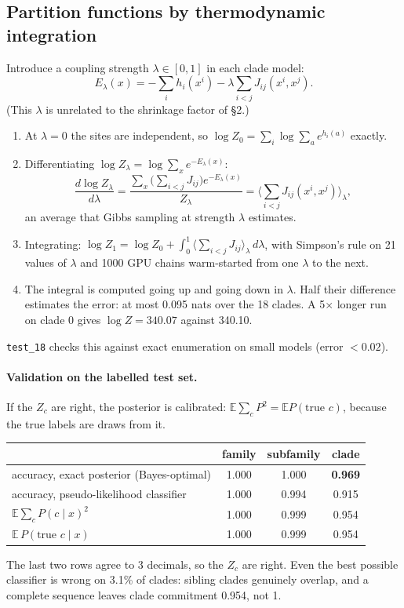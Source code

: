 \documentclass[11pt,a4paper]{article}
\newcommand{\E}{\mathbb{E}}
\begin{document}
\subsection{Partition functions by thermodynamic integration}
Introduce a coupling strength $\lambda\in[0,1]$ in each clade model:
\[
E_\lambda(x)=-\sum_ih_i(x^i)-\lambda\sum_{i<j}J_{ij}(x^i,x^j).
\]
(This $\lambda$ is unrelated to the shrinkage factor of \S2.)
\begin{enumerate}[nosep]
\item At $\lambda=0$ the sites are independent, so $\log Z_0=\sum_i\log\sum_ae^{h_i(a)}$ exactly.
\item Differentiating $\log Z_\lambda=\log\sum_xe^{-E_\lambda(x)}$:
\[
\frac{d\log Z_\lambda}{d\lambda}=\frac{\sum_x\big(\sum_{i<j}J_{ij}\big)e^{-E_\lambda(x)}}{Z_\lambda}
=\Big\langle\sum_{i<j}J_{ij}(x^i,x^j)\Big\rangle_\lambda ,
\]
an average that Gibbs sampling at strength $\lambda$ estimates.
\item Integrating: $\log Z_1=\log Z_0+\int_0^1\big\langle\sum_{i<j}J_{ij}\big\rangle_\lambda\,d\lambda$, with Simpson's rule on
21 values of $\lambda$ and 1000 GPU chains warm-started from one $\lambda$ to the next.
\item The integral is computed going up and going down in $\lambda$. Half their difference estimates the error: at most
0.095 nats over the 18 clades. A 5$\times$ longer run on clade 0 gives $\log Z=340.07$ against 340.10.
\end{enumerate}
\texttt{test\_18} checks this against exact enumeration on small models (error $<0.02$).

\paragraph{Validation on the labelled test set.} If the $Z_c$ are right, the posterior is calibrated:
$\E\sum_cP^2=\E P(\text{true }c)$, because the true labels are draws from it.
\begin{center}\small
\begin{tabular}{lccc}
\toprule
 & family & subfamily & clade\\
\midrule
accuracy, exact posterior (Bayes-optimal) & 1.000 & 1.000 & \textbf{0.969}\\
accuracy, pseudo-likelihood classifier & 1.000 & 0.994 & 0.915\\
$\E\sum_cP(c\mid x)^2$ & 1.000 & 0.999 & 0.954\\
$\E\,P(\text{true }c\mid x)$ & 1.000 & 0.999 & 0.954\\
\bottomrule
\end{tabular}
\end{center}
The last two rows agree to 3 decimals, so the $Z_c$ are right. Even the best possible classifier is wrong on 3.1\% of
clades: sibling clades genuinely overlap, and a complete sequence leaves clade commitment 0.954, not 1.
\end{document}
